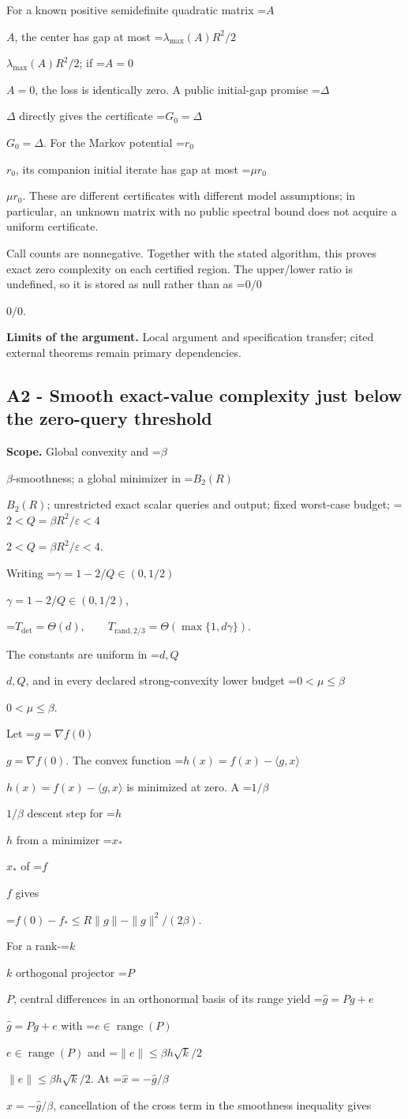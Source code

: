\documentclass[10pt,a4paper]{article}
\newcommand{\AtlasMath}[1]{\par\begingroup\centering\setbox0=\hbox{$\displaystyle #1$}\ifdim\wd0>1.4\linewidth\typeout{ATLAS WIDE FORMULA: \the\wd0}\fi\ifdim\wd0>\linewidth\resizebox{\linewidth}{!}{\box0}\else\box0\fi\par\endgroup}
\newcommand{\AtlasInlineMath}[1]{\begingroup\setbox0=\hbox{$#1$}\ifdim\wd0>.4\linewidth\endgroup\AtlasMath{#1}\else\endgroup$#1$\fi}
\begin{document}
For a known positive semidefinite quadratic matrix \AtlasInlineMath{A}, the center has gap at most \AtlasInlineMath{\lambda_{\max}(A)R^2/2}; if \AtlasInlineMath{A=0}, the loss is identically zero. A public initial-gap promise \AtlasInlineMath{\Delta} directly gives the certificate \AtlasInlineMath{G_0=\Delta}. For the Markov potential \AtlasInlineMath{r_0}, its companion initial iterate has gap at most \AtlasInlineMath{\mu r_0}. These are different certificates with different model assumptions; in particular, an unknown matrix with no public spectral bound does not acquire a uniform certificate.

Call counts are nonnegative. Together with the stated algorithm, this proves exact zero complexity on each certified region. The upper/lower ratio is undefined, so it is stored as null rather than as \AtlasInlineMath{0/0}.

\textbf{Limits of the argument.} Local argument and specification transfer; cited external theorems remain primary dependencies.

\subsection{A2 - Smooth exact-value complexity just below the zero-query threshold}
\textbf{Scope.} Global convexity and \AtlasInlineMath{\beta}-smoothness; a global minimizer in \AtlasInlineMath{B_2(R)}; unrestricted exact scalar queries and output; fixed worst-case budget; \AtlasInlineMath{2<Q=\beta R^2/\varepsilon<4}.

Writing \AtlasInlineMath{\gamma=1-2/Q\in(0,1/2)},

\AtlasMath{T_{\mathrm{det}}=\Theta(d),\qquad T_{\mathrm{rand},2/3}=\Theta(\max\{1,d\gamma\}).}

The constants are uniform in \AtlasInlineMath{d,Q}, and in every declared strong-convexity lower budget \AtlasInlineMath{0<\mu\le\beta}.

Let \AtlasInlineMath{g=\nabla f(0)}. The convex function \AtlasInlineMath{h(x)=f(x)-\langle g,x\rangle} is minimized at zero. A \AtlasInlineMath{1/\beta} descent step for \AtlasInlineMath{h} from a minimizer \AtlasInlineMath{x_*} of \AtlasInlineMath{f} gives

\AtlasMath{f(0)-f_*\le R\|g\|-\|g\|^2/(2\beta).}

For a rank-\AtlasInlineMath{k} orthogonal projector \AtlasInlineMath{P}, central differences in an orthonormal basis of its range yield \AtlasInlineMath{\widehat g=Pg+e} with \AtlasInlineMath{e\in\operatorname{range}(P)} and \AtlasInlineMath{\|e\|\le\beta h\sqrt{k}/2}. At \AtlasInlineMath{\widehat x=-\widehat g/\beta}, cancellation of the cross term in the smoothness inequality gives
\end{document}
